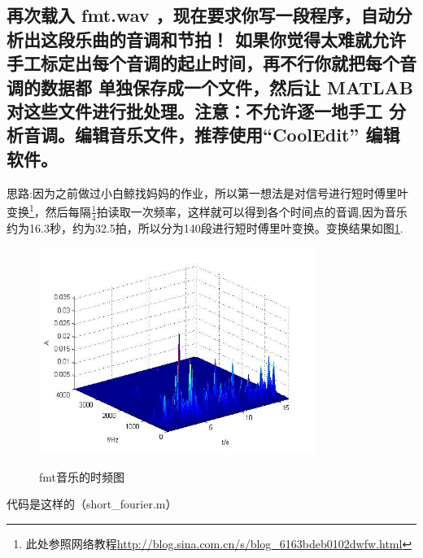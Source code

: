 \documentclass{ctexart}
\begin{document}
    \subsection{
            再次载入 fmt.wav ，现在要求你写一段程序，自动分析出这段乐曲的音调和节拍！
            如果你觉得太难就允许手工标定出每个音调的起止时间，再不行你就把每个音调的数据都
            单独保存成一个文件，然后让 MATLAB 对这些文件进行批处理。注意：不允许逐一地手工
            分析音调。编辑音乐文件，推荐使用“CoolEdit” 编辑软件。
        }

        思路:因为之前做过小白鲸找妈妈的作业，所以第一想法是对信号进行短时傅里叶变换\footnote{此处参照网络教程\url{http://blog.sina.com.cn/s/blog_6163bdeb0102dwfw.html}}，然后每隔$\frac{1}{4}$拍读取一次频率，这样就可以得到各个时间点的音调,因为音乐约为16.3秒，约为32.5拍，所以分为140段进行短时傅里叶变换。变换结果如图\ref{191}.
        \begin{figure}
            \centering
            \includegraphics[width=0.8\textwidth]{fmt/1_9_1.jpg}\\
            \caption{fmt音乐的时频图\label{191}}
        \end{figure}


        代码是这样的（short\_fourier.m）
        
\end{document}

